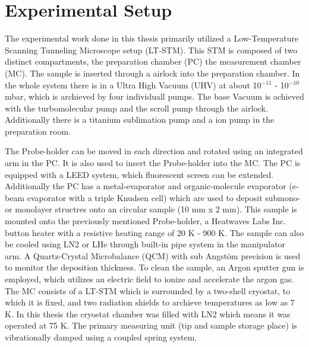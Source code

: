 \chapter{Experimental Setup}
\label{sec:versuchsandordnung}
The experimental work done in this thesis primarily utilized a Low-Temperature Scanning Tunneling Microscope setup (LT-STM).
This STM is composed of two distinct compartments, the preparation chamber (PC) the measurement chamber (MC).
The sample is inserted through a airlock into the preparation chamber.
In the whole system there is in a Ultra High Vacuum (UHV) at about 10$^{-11}$ - 10$^{-10}$ mbar, which is archieved by four individuall pumps.
The base Vacuum is achieved with the turbomolecular pump and the scroll pump through the airlock.
Additionally there is a titanium sublimation pump and a ion pump in the preparation room.


The Probe-holder can be moved in each direction and rotated using an integrated arm in the PC.
It is also used to insert the Probe-holder into the MC.
The PC is equipped with a LEED system, which fluorescent screen can be extended. 
Additionally the PC has a metal-evaporator and organic-molecule evaporator (e-beam evaporator with a triple Knudsen cell) which are used to deposit submono- or monolayer structres onto an circular sample (10 mm x 2 mm).
This sample is mounted onto the previously mentioned Probe-holder, a Heatwaves Labs Inc. button heater with a resistive heating range of 20 K - 900 K.
The sample can also be cooled using LN2 or LHe through built-in pipe system in the manipulator arm.
A Quartz-Crystal Microbalance (QCM) with sub Angstöm precision is used to monitor the deposition thickness.
To clean the sample, an Argon sputter gun is employed, which utilizes an electric field to ionize and accelerate the argon gas.
The MC consists of a LT-STM which is surrounded by a two-shell cryostat, to which it is fixed, and two radiation shields to archieve temperatures as low as 7 K.
In this thesis the cryostat chamber was filled with LN2 which means it was operated at 75 K.
The primary measuring unit (tip and sample storage place) is vibrationally damped using a coupled spring system.


